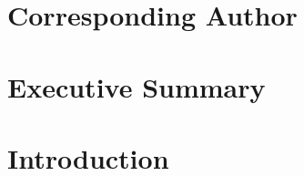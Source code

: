 \documentclass[11pt,a4paper,twoside,onecolumn,openany,final,oldfontcommands]{memoir}
\begin{document}


\frontmatter

\thispagestyle{empty}  %

\clearpage
\setupmaintoc
\tableofcontents 

\clearpage
\listoffigures

\clearpage
\listoftables

\chapter{Corresponding Author}
%






\chapter{Executive Summary}




\mainmatter

\chapter{Introduction}
\end{document}
